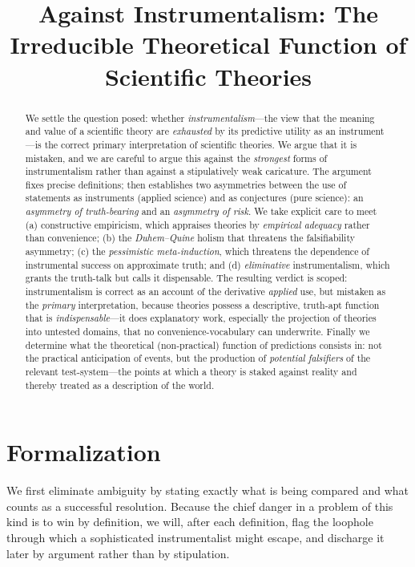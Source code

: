 \documentclass{amsart}
\theoremstyle{definition}
\theoremstyle{plain}
\begin{document}
\title{Against Instrumentalism: The Irreducible Theoretical Function of
Scientific Theories}
\maketitle

\begin{abstract}
We settle the question posed: whether \emph{instrumentalism}---the view that
the meaning and value of a scientific theory are \emph{exhausted} by its
predictive utility as an instrument---is the correct primary interpretation of
scientific theories. We argue that it is mistaken, and we are careful to argue
this against the \emph{strongest} forms of instrumentalism rather than against
a stipulatively weak caricature. The argument fixes precise definitions; then
establishes two asymmetries between the use of statements as instruments
(applied science) and as conjectures (pure science): an \emph{asymmetry of
truth-bearing} and an \emph{asymmetry of risk}. We take explicit care to meet
(a) constructive empiricism, which appraises theories by \emph{empirical
adequacy} rather than convenience; (b) the \emph{Duhem--Quine} holism that
threatens the falsifiability asymmetry; (c) the \emph{pessimistic
meta-induction}, which threatens the dependence of instrumental success on
approximate truth; and (d) \emph{eliminative} instrumentalism, which grants the
truth-talk but calls it dispensable. The resulting verdict is scoped:
instrumentalism is correct as an account of the derivative \emph{applied} use,
but mistaken as the \emph{primary} interpretation, because theories possess a
descriptive, truth-apt function that is \emph{indispensable}---it does
explanatory work, especially the projection of theories into untested domains,
that no convenience-vocabulary can underwrite. Finally we determine what the
theoretical (non-practical) function of predictions consists in: not the
practical anticipation of events, but the production of \emph{potential
falsifiers} of the relevant test-system---the points at which a theory is
staked against reality and thereby treated as a description of the world.
\end{abstract}

\section{Formalization}

We first eliminate ambiguity by stating exactly what is being compared and
what counts as a successful resolution. Because the chief danger in a problem
of this kind is to win by definition, we will, after each definition, flag the
loophole through which a sophisticated instrumentalist might escape, and
discharge it later by argument rather than by stipulation.
\end{document}
